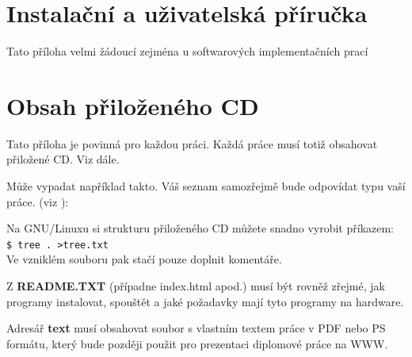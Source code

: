\documentclass[11pt,twoside,a4paper]{book}
\begin{document}
\chapter{Instalační a uživatelská příručka}
Tato příloha velmi žádoucí zejména u softwarových implementačních prací


\chapter{Obsah přiloženého CD}
\label{chap:CD}
Tato příloha je povinná pro každou práci. Každá práce musí totiž obsahovat přiložené CD. Viz dále.

Může vypadat například takto. Váš seznam samozřejmě bude odpovídat typu vaší práce. (viz \cite{infodp}):


Na GNU/Linuxu si strukturu přiloženého CD můžete snadno vyrobit příkazem:\\ 
\verb|$ tree . >tree.txt|\\
Ve vzniklém souboru pak stačí pouze doplnit komentáře.

Z \textbf{README.TXT} (případne index.html apod.)  musí být rovněž zřejmé, jak programy instalovat, spouštět a
jaké požadavky mají tyto programy na hardware.

Adresář \textbf{text}  musí obsahovat soubor s vlastním textem práce v PDF nebo PS formátu, který bude později
použit pro prezentaci diplomové práce na WWW.
\end{document}
